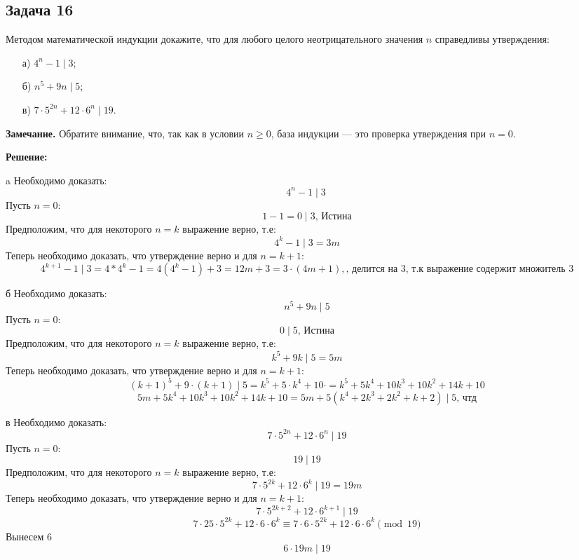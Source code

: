 \documentclass[a4paper,12pt]{article}
\begin{document}
\subsection{Задача 16}
Методом математической индукции докажите, что для любого целого неотрицательного значения \(n\) справедливы утверждения:
\begin{itemize}
    \item[а)] \(4^n - 1 \mid 3\);
    \item[б)] \(n^5 + 9n \mid 5\);
    \item[в)] \(7 \cdot 5^{2n} + 12 \cdot 6^n \mid 19\).
\end{itemize}

\textbf{Замечание.} Обратите внимание, что, так как в условии \(n \geq 0\), база индукции — это проверка утверждения при \(n = 0\).

\textbf{Решение:}
\item[a] 
Необходимо доказать:
\[
4^n - 1 \mid 3\
\]
Пусть $n = 0$:
\[
1-1=0\mid3 \text{, Истина}
\]
Предположим, что для некоторого $n=k$ выражение верно, т.е:
\[
4^k - 1 \mid 3 = 3m
\]
Теперь необходимо доказать, что утверждение верно и для $n=k+1$:
\[
4^{k+1} - 1 \mid 3 = 4*4^k-1 = 4(4^k-1) + 3 = 12m+3= 3\cdot(4m+1), \text{, делится на 3, т.к выражение содержит множитель 3}
\]
\item[б]
Необходимо доказать:
\[
n^5 + 9n \mid 5
\]
Пусть $n=0$:
\[
0\mid 5 \text{, Истина}
\]
Предположим, что для некоторого $n=k$ выражение верно, т.е:
\[
k^5 + 9k \mid 5 = 5m
\]
Теперь необходимо доказать, что утверждение верно и для $n=k+1$:
\[
(k+1)^5+9\cdot (k+1) \mid 5 = k^5+5\cdot k^4+10\cdot = k^5 + 5k^4 + 10k^3 + 10k^2 + 14k + 10
\]
\[
5m + 5k^4+10k^3+10k^2+14k+10 = 5m + 5(k^4+2k^3+2k^2+k+2)\mid 5 \text{, чтд}
\]
\item[в]
Необходимо доказать:
\[
7 \cdot 5^{2n} + 12 \cdot 6^n \mid 19
\]
Пусть $n=0$:
\[
19\mid 19
\]
Предположим, что для некоторого $n=k$ выражение верно, т.е:
\[
7 \cdot 5^{2k} + 12 \cdot 6^k \mid 19 = 19m
\]
Теперь необходимо доказать, что утверждение верно и для $n=k+1$:
\[
7 \cdot 5^{2k + 2} + 12 \cdot 6^{k+1} \mid 19
\]
\[
7\cdot 25\cdot 5^{2k} + 12 \cdot 6\cdot 6^k \equiv 7\cdot 6\cdot 5^{2k}+12\cdot 6\cdot 6^k \pmod{19}
\]
Вынесем $6$
\[
6\cdot 19m \mid 19
\]
\vspace{1cm}
\end{document}

